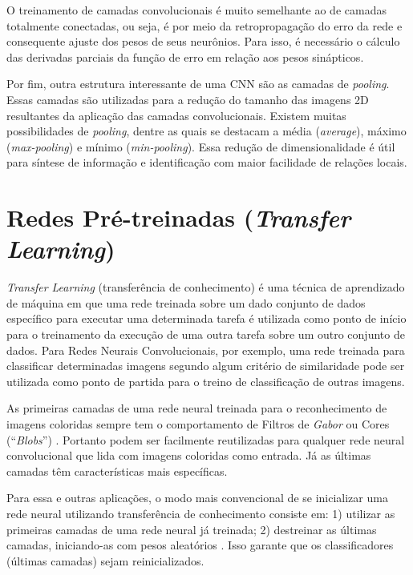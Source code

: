 O treinamento de camadas convolucionais é muito semelhante ao de camadas totalmente conectadas, ou seja, é por meio da retropropagação do erro da rede e consequente ajuste dos pesos de seus neurônios. Para isso, é necessário o cálculo das derivadas parciais da função de erro em relação aos pesos sinápticos.

Por fim, outra estrutura interessante de uma CNN são as camadas de \textit{pooling}. Essas camadas são utilizadas para a redução do tamanho das imagens 2D resultantes da aplicação das camadas convolucionais. Existem muitas possibilidades de \textit{pooling}, dentre as quais se destacam a média (\textit{average}), máximo (\textit{max-pooling})  e mínimo (\textit{min-pooling}). Essa redução de dimensionalidade é útil para síntese de informação \cite{cirecsan2011high} e identificação com maior facilidade de relações locais.

\chapter{Redes Pré-treinadas (\textit{Transfer Learning})}

\textit{Transfer Learning} (transferência de conhecimento) é uma técnica de aprendizado de máquina em que uma rede treinada sobre um dado
conjunto de dados específico para executar uma determinada tarefa é utilizada como ponto de início para o treinamento da execução de uma outra tarefa sobre um outro conjunto de dados. Para Redes Neurais Convolucionais, por exemplo, uma rede treinada para classificar determinadas imagens segundo algum critério de similaridade pode ser utilizada como ponto de partida para o treino de classificação de outras imagens.

As primeiras camadas de uma rede neural treinada para o reconhecimento de imagens coloridas sempre tem o comportamento de Filtros de \textit{Gabor} ou Cores (“\textit{Blobs}”) \cite{yosinski2014transferable}. Portanto podem ser facilmente reutilizadas para qualquer rede neural convolucional que lida com imagens coloridas como entrada. Já as últimas camadas têm características mais específicas.

Para essa e outras aplicações, o modo mais convencional de se inicializar uma rede neural utilizando transferência de conhecimento consiste em: 1) utilizar as primeiras camadas de uma rede neural já treinada; 2) destreinar as últimas camadas, iniciando-as com pesos aleatórios \cite{yosinski2014transferable}. Isso garante que os classificadores (últimas camadas) sejam reinicializados. 

